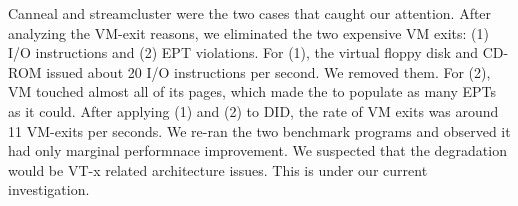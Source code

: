 Canneal and streamcluster were the two cases that caught our
attention. After analyzing the VM-exit reasons, we eliminated
the two expensive VM exits: (1) I/O instructions and (2) EPT
violations. For (1), the virtual floppy disk and CD-ROM issued
about 20 I/O instructions per second. We removed them. For
(2), VM touched almost all of its pages, which made the \na to
populate as many EPTs as it could. After applying (1) and (2)
to DID, the rate of VM exits was around 11 VM-exits per
seconds. We re-ran the two benchmark programs and observed it
had only marginal performnace improvement. We suspected that
the degradation would be VT-x related architecture issues.
This is under our current investigation.


